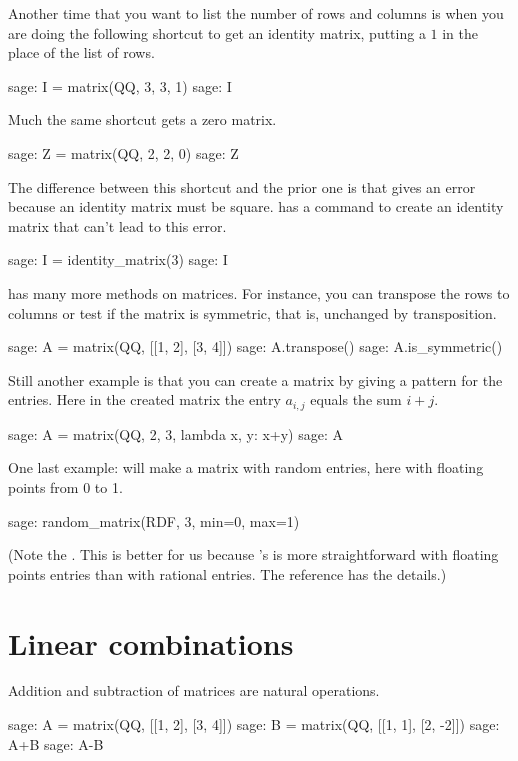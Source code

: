 Another time that you want to list the
number of rows and columns is when you are doing 
the following shortcut to get an identity matrix, putting  
a $1$ in the place of the list of rows.
\begin{sagecommandline}
sage: I = matrix(QQ, 3, 3, 1)                     
sage: I
\end{sagecommandline}
Much the same shortcut gets a zero matrix.
\begin{sagecommandline}
sage: Z = matrix(QQ, 2, 2, 0)
sage: Z
\end{sagecommandline}
The difference between this shortcut and the prior one is that 
 gives an error because 
an identity matrix must be square.
\Sage{} has a command to create an identity matrix 
that can't lead to this error.
\begin{sagecommandline}
sage: I = identity_matrix(3)
sage: I
\end{sagecommandline}

\Sage{} has many more methods on matrices.
For instance, you can transpose the rows to columns or test if the 
matrix is symmetric, that is, 
unchanged by transposition.
\begin{sagecommandline}
sage: A = matrix(QQ, [[1, 2], [3, 4]])
sage: A.transpose()
sage: A.is_symmetric()
\end{sagecommandline}
Still another example is that you can create a matrix by giving a pattern
for the entries.
Here in the created matrix the entry $a_{i,j}$ equals the sum
$i+j$.
\begin{sagecommandline}
sage: A = matrix(QQ, 2, 3, lambda x, y: x+y)
sage: A
\end{sagecommandline}
One last example:
\Sage{} will make a matrix with random entries, here
with floating points from 0 to 1.
\begin{sagecommandline}
sage: random_matrix(RDF, 3, min=0, max=1)
\end{sagecommandline}
(Note the .
This is better for us because \Sage's  
is more straightforward with floating points entries than with 
rational entries.
The \Sage{} reference has the details.)




\section{Linear combinations}
Addition and subtraction of matrices are natural operations.
\begin{sagecommandline}
sage: A = matrix(QQ, [[1, 2], [3, 4]])
sage: B = matrix(QQ, [[1, 1], [2, -2]])
sage: A+B
sage: A-B
\end{sagecommandline}

